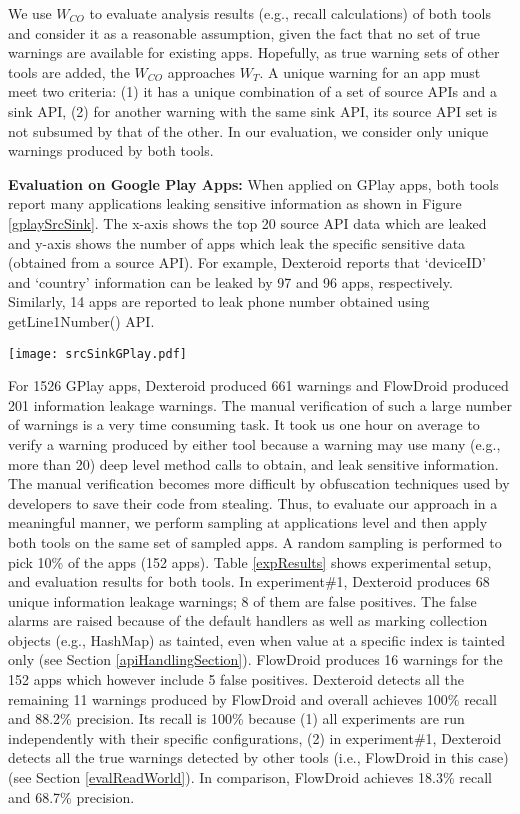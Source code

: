 \documentclass[10pt]{elsarticle}
\begin{document}
We use $W_{CO}$ to evaluate analysis results (e.g., recall calculations) of both tools and consider it as a reasonable assumption, given the fact that no set of true warnings are available for existing apps. Hopefully, as true warning sets of other tools are added, the $W_{CO}$ approaches $W_{T}$. A unique warning for an app must meet two criteria: (1) it has a unique combination of a set of source APIs and a sink API, (2) for another warning with the same sink API, its source API set is not subsumed by that of the other. In our evaluation, we consider only unique warnings produced by both tools.


{\noindent \bf Evaluation on Google Play Apps:} When applied on GPlay apps, both tools report many applications leaking sensitive information as shown in Figure \ref{gplaySrcSink}. The x-axis shows the top 20 source API data which are leaked and y-axis shows the number of apps which leak the specific sensitive data (obtained from a source API). For example, Dexteroid reports that `deviceID' and `country' information can be leaked by 97 and 96 apps, respectively. Similarly, 14 apps are reported to leak phone number obtained using {\ttfamily getLine1Number()} API.

\begin{figure*}[ht]
\centering
\texttt{[image: srcSinkGPlay.pdf]}
\caption{Information Leakage Detection by Dexteroid and FlowDroid in 1526 Google Play Apps}
\label{gplaySrcSink}
\end{figure*}


For 1526 GPlay apps, Dexteroid produced 661 warnings and FlowDroid produced 201 information leakage warnings. The manual verification of such a large number of warnings is a very time consuming task. It took us one hour on average to verify a warning produced by either tool because a warning may use many (e.g., more than 20) deep level method calls to obtain, and leak sensitive information. The manual verification becomes more difficult by obfuscation techniques used by developers to save their code from stealing. Thus, to evaluate our approach in a meaningful manner, we perform sampling at applications level and then apply both tools on the same set of sampled apps. A random sampling is performed to pick 10\% of the apps (152 apps). Table \ref{expResults} shows experimental setup, and evaluation results for both tools. In experiment\#1, Dexteroid produces 68 unique information leakage warnings; 8 of them are false positives. The false alarms are raised because of the default handlers as well as marking collection objects (e.g., {\ttfamily HashMap}) as tainted, even when value at a specific index is tainted only (see Section \ref{apiHandlingSection}). FlowDroid produces 16 warnings for the 152 apps which however include 5 false positives. Dexteroid detects all the remaining 11 warnings produced by FlowDroid and overall achieves 100\% recall and 88.2\% precision. Its recall is 100\% because (1) all experiments are run independently with their specific configurations, (2) in experiment\#1, Dexteroid detects all the true warnings detected by other tools (i.e., FlowDroid in this case) (see Section \ref{evalReadWorld}). In comparison, FlowDroid achieves 18.3\% recall and 68.7\% precision.
\end{document}
